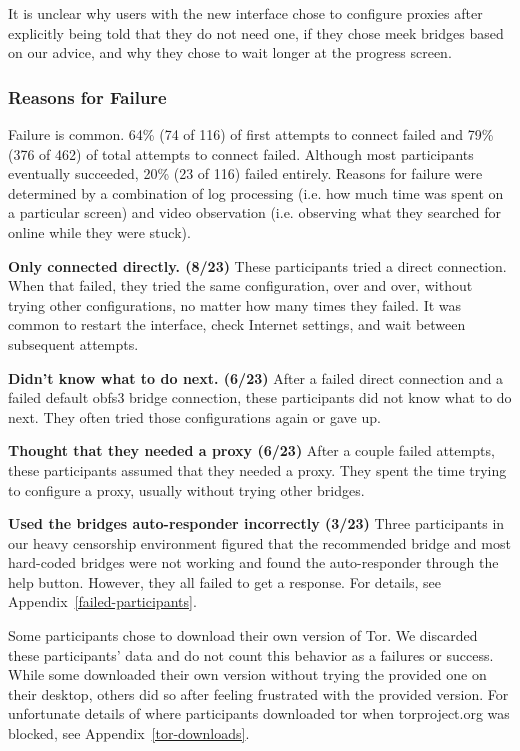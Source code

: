 \documentclass[USenglish,oneside,twocolumn]{article}
\begin{document}
It is unclear why users with the new interface chose to configure proxies after explicitly being told that they do not need one, if they chose meek bridges based on our advice, and why they chose to wait longer at the progress screen. 

\subsubsection{Reasons for Failure} 
Failure is common. 64\% (74 of 116) of first attempts to connect failed and 79\% (376 of 462) of total attempts to connect failed. Although most participants eventually succeeded, 20\% (23 of 116) failed entirely. Reasons for failure were determined by a combination of log processing (i.e. how much time was spent on a particular screen) and video observation (i.e. observing what they searched for online while they were stuck). \\ 

\begin{description}
\item {\bfseries Only connected directly. (8/23)} These participants tried a direct connection. When that failed, they tried the same configuration, over and over, without trying other configurations, no matter how many times they failed. It was common to restart the interface, check Internet settings, and wait between subsequent attempts. 
\item {\bfseries Didn't know what to do next. (6/23)} After a failed direct connection and a failed default obfs3 bridge connection, these participants did not know what to do next. They often tried those configurations again or gave up. 
\item {\bfseries Thought that they needed a proxy (6/23)} After a couple failed attempts, these participants assumed that they needed a proxy. They spent the time trying to configure a proxy, usually without trying other bridges. 
\item {\bfseries Used the bridges auto-responder incorrectly (3/23)} Three participants in our heavy censorship environment figured that the recommended bridge and most hard-coded bridges were not working and found the auto-responder through the help button. However, they all failed to get a response. For details, see Appendix~\ref{failed-participants}.
\end{description} 

Some participants chose to download their own version of Tor. We discarded these participants' data and do not count this behavior as a failures or success. While some downloaded their own version without trying the provided one on their desktop, others did so after feeling frustrated with the provided version. For unfortunate details of where participants downloaded tor when torproject.org was blocked, see Appendix~\ref{tor-downloads}.
\end{document}
